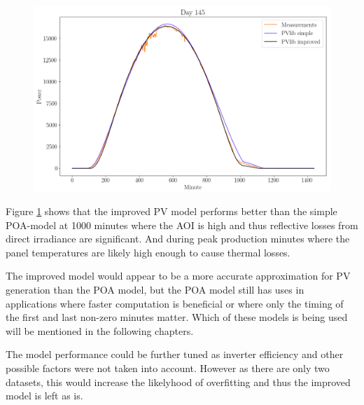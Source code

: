 \newpage
\begin{figure}[h]
\centering
\includegraphics[width=0.99\linewidth]{pics/pvlibsimplecomplex}
\label{fig-poa_eval_simplecomplex}
\end{figure}

\noindent Figure \ref{fig-poa_eval_simplecomplex} shows that the improved PV model performs better than the simple POA-model at 1000 minutes where the AOI is high and thus reflective losses from direct irradiance are significant. And during peak production minutes where the panel temperatures are likely high enough to cause thermal losses.

The improved model would appear to be a more accurate approximation for PV generation than the POA model, but the POA model still has uses in applications where faster computation is beneficial or where only the timing of the first and last non-zero minutes matter. Which of these models is being used will be mentioned in the following chapters.

The model performance could be further tuned as inverter efficiency and other possible factors were not taken into account. However as there are only two datasets, this would increase the likelyhood of overfitting and thus the improved model is left as is.



